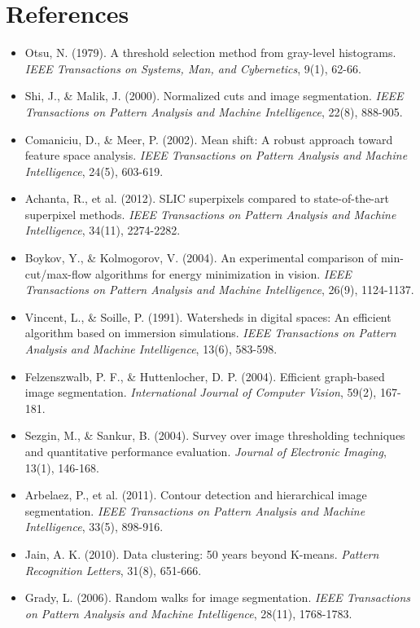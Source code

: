 \documentclass[a4paper, 11pt]{article}
\begin{document}
\section*{References}

\begin{itemize}
\item Otsu, N. (1979). A threshold selection method from gray-level histograms. \textit{IEEE Transactions on Systems, Man, and Cybernetics}, 9(1), 62-66.
\item Shi, J., \& Malik, J. (2000). Normalized cuts and image segmentation. \textit{IEEE Transactions on Pattern Analysis and Machine Intelligence}, 22(8), 888-905.
\item Comaniciu, D., \& Meer, P. (2002). Mean shift: A robust approach toward feature space analysis. \textit{IEEE Transactions on Pattern Analysis and Machine Intelligence}, 24(5), 603-619.
\item Achanta, R., et al. (2012). SLIC superpixels compared to state-of-the-art superpixel methods. \textit{IEEE Transactions on Pattern Analysis and Machine Intelligence}, 34(11), 2274-2282.
\item Boykov, Y., \& Kolmogorov, V. (2004). An experimental comparison of min-cut/max-flow algorithms for energy minimization in vision. \textit{IEEE Transactions on Pattern Analysis and Machine Intelligence}, 26(9), 1124-1137.
\item Vincent, L., \& Soille, P. (1991). Watersheds in digital spaces: An efficient algorithm based on immersion simulations. \textit{IEEE Transactions on Pattern Analysis and Machine Intelligence}, 13(6), 583-598.
\item Felzenszwalb, P. F., \& Huttenlocher, D. P. (2004). Efficient graph-based image segmentation. \textit{International Journal of Computer Vision}, 59(2), 167-181.
\item Sezgin, M., \& Sankur, B. (2004). Survey over image thresholding techniques and quantitative performance evaluation. \textit{Journal of Electronic Imaging}, 13(1), 146-168.
\item Arbelaez, P., et al. (2011). Contour detection and hierarchical image segmentation. \textit{IEEE Transactions on Pattern Analysis and Machine Intelligence}, 33(5), 898-916.
\item Jain, A. K. (2010). Data clustering: 50 years beyond K-means. \textit{Pattern Recognition Letters}, 31(8), 651-666.
\item Grady, L. (2006). Random walks for image segmentation. \textit{IEEE Transactions on Pattern Analysis and Machine Intelligence}, 28(11), 1768-1783.

\end{itemize}
\end{document}
